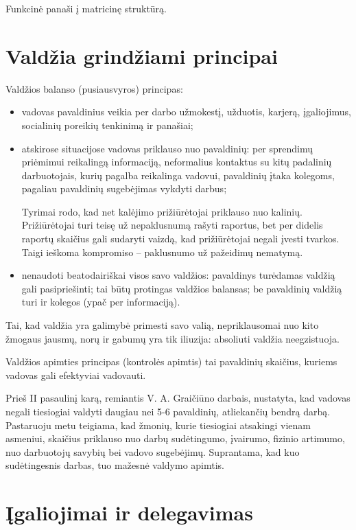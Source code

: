 Funkcinė panaši į matricinę struktūrą.

\section{Valdžia grindžiami principai}

Valdžios balanso (pusiausvyros) principas:
\begin{itemize}
  \item vadovas pavaldinius veikia per darbo užmokestį, užduotis, karjerą,
    įgaliojimus, socialinių poreikių tenkinimą ir panašiai;
  \item atskirose situacijose vadovas priklauso nuo pavaldinių: per
    sprendimų priėmimui reikalingą informaciją, neformalius kontaktus
    su kitų padalinių darbuotojais, kurių pagalba reikalinga vadovui,
    pavaldinių įtaka kolegoms, pagaliau pavaldinių sugebėjimas vykdyti
    darbus;
    \begin{exmp}
      Tyrimai rodo, kad net kalėjimo prižiūrėtojai priklauso nuo kalinių.
      Prižiūrėtojai turi teisę už nepaklusnumą rašyti raportus, bet
      per didelis raportų skaičius gali sudaryti vaizdą, kad prižiūrėtojai
      negali įvesti tvarkos. Taigi ieškoma kompromiso – paklusnumo
      už pažeidimų nematymą.
    \end{exmp}
  \item nenaudoti beatodairiškai visos savo valdžios: pavaldinys
    turėdamas valdžią gali pasipriešinti; tai būtų protingas valdžios
    balansas; be pavaldinių valdžią turi ir kolegos (ypač per informaciją).
\end{itemize}
Tai, kad valdžia yra galimybė primesti savo valią, nepriklausomai nuo
kito žmogaus jausmų, norų ir gabumų yra tik iliuzija: absoliuti valdžia
neegzistuoja.


Valdžios apimties principas (kontrolės apimtis) tai pavaldinių
skaičius, kuriems vadovas gali efektyviai vadovauti.

Prieš II pasaulinį karą, remiantis V. A. Graičiūno darbais,
nustatyta, kad vadovas negali tiesiogiai valdyti daugiau nei 5-6
pavaldinių, atliekančių bendrą darbą. Pastaruoju metu teigiama, kad
žmonių, kurie tiesiogiai atsakingi vienam asmeniui, skaičius
priklauso nuo darbų sudėtingumo, įvairumo, fizinio artimumo, nuo
darbuotojų savybių bei vadovo sugebėjimų. Suprantama, kad kuo
sudėtingesnis darbas, tuo mažesnė valdymo apimtis.

\section{Įgaliojimai ir delegavimas}

